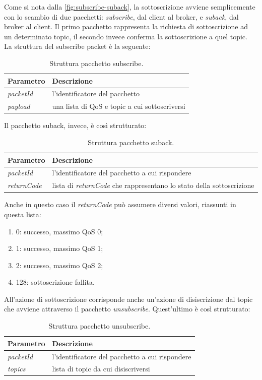 \documentclass[binding=0.6cm,TFA]{sapthesis}
\begin{document}
\begin{large}
Come si nota dalla \autoref{fig:subscribe-suback}, la sottoscrizione avviene semplicemente con lo scambio di due pacchetti: \textit{subscribe}, dal client al broker, e \textit{suback}, dal broker al client. Il primo pacchetto rappresenta la richiesta di sottoscrizione ad un determinato topic, il secondo invece conferma la sottoscrizione a quel topic. \\
La struttura del subscribe packet è la seguente:

\begin{table}[h]
\caption{Struttura pacchetto subscribe.}
\label{tab:subscribe}
\begin{tabular}{lp{}}
\toprule
\textbf{Parametro} & \textbf{Descrizione} \\
\midrule
\textit{packetId} & l'identificatore del pacchetto \\
\textit{payload} & una lista di QoS e topic a cui sottoscriversi \\
\bottomrule
\end{tabular}
\end{table}
Il pacchetto suback, invece, è così strutturato:
\begin{table}[h]
\caption{Struttura pacchetto suback.}
\label{tab:suback}
\begin{tabular}{lp{}}
\toprule
\textbf{Parametro} & \textbf{Descrizione} \\
\midrule
\textit{packetId} & l'identificatore del pacchetto a cui rispondere \\
\textit{returnCode} & lista di \textit{returnCode} che rappresentano lo stato della sottoscrizione \\
\bottomrule
\end{tabular}
\end{table}

Anche in questo caso il \textit{returnCode} può assumere diversi valori, riassunti in questa lista:
\begin{enumerate}
\item 0: successo, massimo QoS 0;
\item 1: successo, massimo QoS 1;
\item 2: successo, massimo QoS 2;
\item 128: sottoscrizione fallita.
\end{enumerate}

All'azione di sottoscrizione corrisponde anche un'azione di disiscrizione dal topic che avviene attraverso il pacchetto \textit{unsubscribe}. Quest'ultimo è così strutturato:
\begin{table}[h]
\caption{Struttura pacchetto unsubscribe.}
\label{tab:unsubscribe}
\begin{tabular}{lp{}}
\toprule
\textbf{Parametro} & \textbf{Descrizione} \\
\midrule
\textit{packetId} & l'identificatore del pacchetto a cui rispondere \\
\textit{topics} & lista di topic da cui disiscriversi \\
\bottomrule
\end{tabular}
\end{table}


\end{large}
\end{document}
